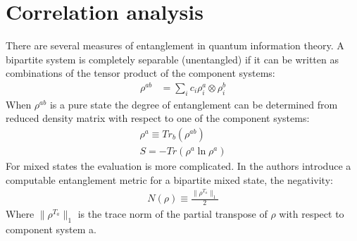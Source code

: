 \documentclass[a4paper,11pt, twocolumn]{article}
\numberwithin{equation}{section}
\begin{document}
\section{Correlation analysis}
There are several measures of entanglement in quantum information theory. 
A bipartite system is completely separable (unentangled) if it can be written as combinations of the tensor product of the component systems:
\begin{align}
 \rho^{ab} &= \sum_i c_i \rho_i^a \otimes \rho_i^b
\end{align}
When $\rho^{ab}$ is a pure state the degree of entanglement can be determined from reduced density matrix with respect to one of the component systems:
\begin{align}
 \rho^a \equiv Tr_b(\rho^{ab} )\\
 S = -Tr(\rho^a\ln{\rho^a} )
\end{align}
For mixed states the evaluation is more complicated. 
In \cite{qent} the authors introduce a computable entanglement metric for a bipartite mixed state, the negativity:
\begin{align}
 N(\rho) \equiv \frac{\|\rho^{T_a}\|_1}{2}
\end{align}
Where $\|\rho^{T_a}\|_1$ is the trace norm of the partial transpose of $\rho$ with respect to component system a.
\end{document}
